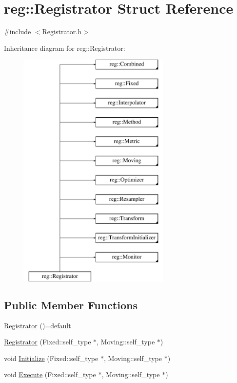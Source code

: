 \hypertarget{structreg_1_1_registrator}{}\section{reg\+:\+:Registrator Struct Reference}
\label{structreg_1_1_registrator}


{\ttfamily \#include $<$Registrator.\+h$>$}

Inheritance diagram for reg\+:\+:Registrator\+:\begin{figure}[H]
\begin{center}
\leavevmode
\includegraphics[height=12.000000cm]{structreg_1_1_registrator}
\end{center}
\end{figure}
\subsection*{Public Member Functions}
\begin{DoxyCompactItemize}
\item 
\hyperlink{structreg_1_1_registrator_a0a8d44017cb8112001a1d13f984145ef}{Registrator} ()=default
\item 
\hyperlink{structreg_1_1_registrator_a63b1984827ba8ccbbc785502bbc3c5da}{Registrator} (Fixed\+::self\+\_\+type $\ast$, Moving\+::self\+\_\+type $\ast$)
\item 
void \hyperlink{structreg_1_1_registrator_a8415aef78761d11e560d280ce30f0de8}{Initialize} (Fixed\+::self\+\_\+type $\ast$, Moving\+::self\+\_\+type $\ast$)
\item 
void \hyperlink{structreg_1_1_registrator_ac8709c0e86e8e53bffc04ae517bdb863}{Execute} (Fixed\+::self\+\_\+type $\ast$, Moving\+::self\+\_\+type $\ast$)
\end{DoxyCompactItemize}


